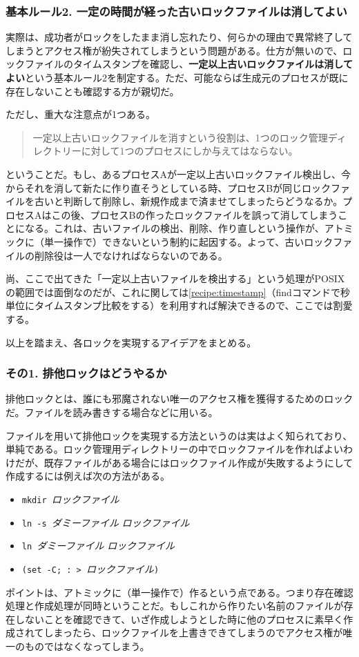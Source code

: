 \subsubsection*{基本ルール2. 一定の時間が経った古いロックファイルは消してよい}
実際は、成功者がロックをしたまま消し忘れたり、何らかの理由で異常終了してしまうとアクセス権が紛失されてしまうという問題がある。仕方が無いので、ロックファイルのタイムスタンプを確認し、\textbf{一定以上古いロックファイルは消してよい}という基本ルール2を制定する。ただ、可能ならば生成元のプロセスが既に存在しないことも確認する方が親切だ。

ただし、重大な注意点が1つある。
\begin{quotation}
	\noindent
	一定以上古いロックファイルを消すという役割は、1つのロック管理ディレクトリーに対して1つのプロセスにしか与えてはならない。
\end{quotation}
ということだ。もし、あるプロセスAが一定以上古いロックファイル検出し、今からそれを消して新たに作り直そうとしている時、プロセスBが同じロックファイルを古いと判断して削除し、新規作成まで済ませてしまったらどうなるか。プロセスAはこの後、プロセスBの作ったロックファイルを誤って消してしまうことになる。これは、古いファイルの検出、削除、作り直しという操作が、アトミックに（単一操作で）できないという制約に起因する。よって、古いロックファイルの削除役は一人でなければならないのである。

尚、ここで出てきた「一定以上古いファイルを検出する」という処理がPOSIXの範囲では面倒なのだが、これに関しては\ref{recipe:timestamp}（findコマンドで秒単位にタイムスタンプ比較をする）を利用すれば解決できるので、ここでは割愛する。

以上を踏まえ、各ロックを実現するアイデアをまとめる。

\subsubsection*{その1. 排他ロックはどうやるか}
排他ロックとは、誰にも邪魔されない唯一のアクセス権を獲得するためのロックだ。ファイルを読み書きする場合などに用いる。

ファイルを用いて排他ロックを実現する方法というのは実はよく知られており、単純である。ロック管理用ディレクトリーの中でロックファイルを作ればよいわけだが、既存ファイルがある場合にはロックファイル作成が失敗するようにして作成するには例えば次の方法がある。
\begin{itemize}
  \item \verb|mkdir |\textit{ロックファイル}
  \item \verb|ln -s |\textit{ダミーファイル} \textit{ロックファイル}
  \item \verb|ln |\textit{ダミーファイル} \textit{ロックファイル}
  \item \verb|(set -C; : > |\textit{ロックファイル}\verb|)|
\end{itemize}
ポイントは、アトミックに（単一操作で）作るという点である。つまり存在確認処理と作成処理が同時ということだ。もしこれから作りたい名前のファイルが存在しないことを確認できて、いざ作成しようとした時に他のプロセスに素早く作成されてしまったら、ロックファイルを上書きできてしまうのでアクセス権が唯一のものではなくなってしまう。

